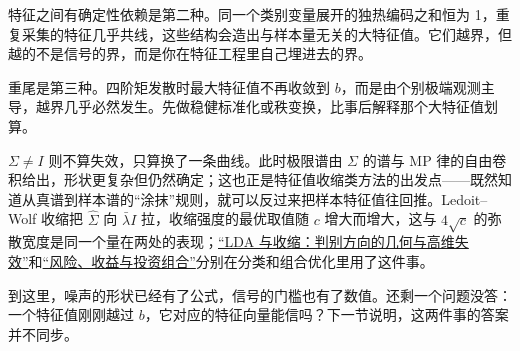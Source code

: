 特征之间有确定性依赖是第二种。同一个类别变量展开的独热编码之和恒为 1，重复采集的特征几乎共线，这些结构会造出与样本量无关的大特征值。它们越界，但越的不是信号的界，而是你在特征工程里自己埋进去的界。

重尾是第三种。四阶矩发散时最大特征值不再收敛到 \(b\)，而是由个别极端观测主导，越界几乎必然发生。先做稳健标准化或秩变换，比事后解释那个大特征值划算。

\(\Sigma\ne I\) 则不算失效，只算换了一条曲线。此时极限谱由 \(\Sigma\) 的谱与 MP 律的自由卷积给出，形状更复杂但仍然确定；这也正是特征值收缩类方法的出发点——既然知道从真谱到样本谱的``涂抹''规则，就可以反过来把样本特征值往回推。Ledoit--Wolf 收缩把 \(\widehat\Sigma\) 向 \(\bar\lambda I\) 拉，收缩强度的最优取值随 \(c\) 增大而增大，这与 \(4\sqrt c\) 的弥散宽度是同一个量在两处的表现；\hyperref[sec:13-Machine-Learning/06-Probabilistic-Models/02]{``LDA 与收缩：判别方向的几何与高维失效''}和\hyperref[sec:09-Convex-Optimization/07-Applications/04]{``风险、收益与投资组合''}分别在分类和组合优化里用了这件事。

到这里，噪声的形状已经有了公式，信号的门槛也有了数值。还剩一个问题没答：一个特征值刚刚越过 \(b\)，它对应的特征向量能信吗？下一节说明，这两件事的答案并不同步。
